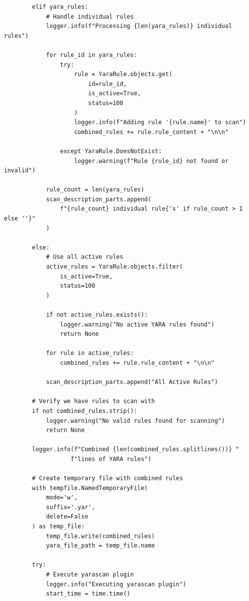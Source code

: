 \begin{verbatim}
        elif yara_rules:
            # Handle individual rules
            logger.info(f"Processing {len(yara_rules)} individual rules")
            
            for rule_id in yara_rules:
                try:
                    rule = YaraRule.objects.get(
                        id=rule_id,
                        is_active=True,
                        status=100
                    )
                    logger.info(f"Adding rule '{rule.name}' to scan")
                    combined_rules += rule.rule_content + "\n\n"
                    
                except YaraRule.DoesNotExist:
                    logger.warning(f"Rule {rule_id} not found or invalid")
            
            rule_count = len(yara_rules)
            scan_description_parts.append(
                f"{rule_count} individual rule{'s' if rule_count > 1 else ''}"
            )
        
        else:
            # Use all active rules
            active_rules = YaraRule.objects.filter(
                is_active=True, 
                status=100
            )
            
            if not active_rules.exists():
                logger.warning("No active YARA rules found")
                return None
            
            for rule in active_rules:
                combined_rules += rule.rule_content + "\n\n"
            
            scan_description_parts.append("All Active Rules")
        
        # Verify we have rules to scan with
        if not combined_rules.strip():
            logger.warning("No valid rules found for scanning")
            return None
        
        logger.info(f"Combined {len(combined_rules.splitlines())} "
                   f"lines of YARA rules")
        
        # Create temporary file with combined rules
        with tempfile.NamedTemporaryFile(
            mode='w', 
            suffix='.yar', 
            delete=False
        ) as temp_file:
            temp_file.write(combined_rules)
            yara_file_path = temp_file.name
        
        try:
            # Execute yarascan plugin
            logger.info("Executing yarascan plugin")
            start_time = time.time()
            

\end{verbatim}

